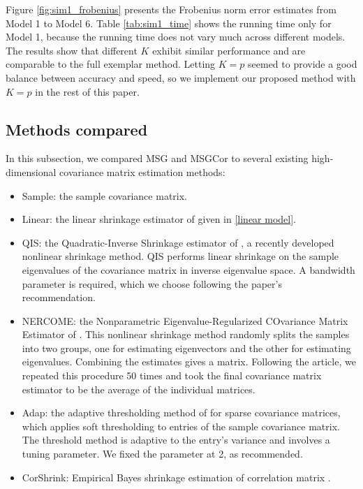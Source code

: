 \documentclass[useAMS,referee,usenatbib]{biom}
\begin{document}
Figure \ref{fig:sim1_frobenius} presents the Frobenius norm error estimates from Model 1 to Model 6. Table \eqref{tab:sim1_time} shows the running time only for Model 1, because the running time does not vary much across different models. The results show that different $K$ exhibit similar performance and are comparable to the full exemplar method. Letting $K = p$ seemed to provide a good balance between accuracy and speed, so we implement our proposed method with $K = p$ in the rest of this paper.

\subsection{\label{compared}Methods compared}

In this subsection, we compared MSG and MSGCor to several existing high-dimensional covariance matrix estimation methods:

\begin{itemize}
\item Sample: the sample covariance matrix.
  
\item Linear: the linear shrinkage estimator of \citet{ledoit2004well} given in \eqref{linear model}.
  
\item QIS: the Quadratic-Inverse Shrinkage estimator of \citet{ledoit2019quadratic}, a recently developed nonlinear shrinkage method. QIS performs linear shrinkage on the sample eigenvalues of the covariance matrix in inverse eigenvalue space. A bandwidth parameter is required, which we choose following the paper's recommendation.
  
\item NERCOME: the Nonparametric Eigenvalue-Regularized COvariance Matrix Estimator of \citet{lam2016nonparametric}. This nonlinear shrinkage method randomly splits the samples into two groups, one for estimating eigenvectors and the other for estimating eigenvalues. Combining the estimates gives a matrix. Following the article, we repeated this procedure 50 times and took the final covariance matrix estimator to be the average of the individual matrices.
  
\item Adap: the adaptive thresholding method of \citep{cai2011adaptive} for sparse covariance matrices, which applies soft thresholding to entries of the sample covariance matrix. The threshold method is adaptive to the entry's variance and involves a tuning parameter. We fixed the parameter at 2, as recommended.

\item CorShrink: Empirical Bayes shrinkage estimation of correlation matrix \citep{dey2018corshrink}.
\end{itemize}
\end{document}
